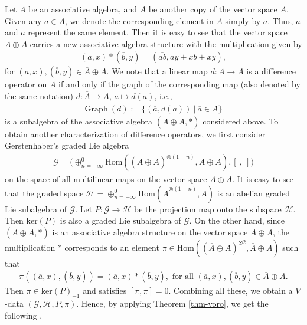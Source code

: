 \documentclass[a4paper,reqno,10pt]{amsart}
\theoremstyle{plain}
\theoremstyle{definition}
\theoremstyle{remark}
\begin{document}
Let $A$ be an associative algebra, and $\overline{A}$ be another copy of the vector space $A$. Given any $a \in A$, we denote the corresponding element in $\overline{A}$ simply by $\overline{a}$. Thus, $a$ and $\overline{a}$ represent the same element. Then it is easy to see that the vector space $ \overline{A} \oplus A$ carries a new associative algebra structure with the multiplication given by 
\begin{align*}
     (\overline{a}, x) \ast (\overline{b}, y) = ( \overline{a b}, a y + x b + xy),
\end{align*}
for $(\overline{a}, x) ,  (\overline{b}, y) \in \overline{A} \oplus A$. We note that a linear map $d : A \rightarrow A$ is a difference operator on $A$ if and only if the graph of the corresponding map (also denoted by the same notation) $d: \overline{A} \rightarrow A$, $\overline{a} \mapsto d(a)$, i.e., 
\begin{align*}
    \mathrm{Graph} ~ \! (d) := \{ ( \overline{a}, d(a)) ~ \! | ~ \! \overline{a} \in \overline{A} \}
\end{align*}
is a subalgebra of the associative algebra $(  \overline{A} \oplus A, \ast )$ considered above. To obtain another characterization of difference operators, we first consider Gerstenhaber's graded Lie algebra
\begin{align*}
    \mathcal{G} = \big( \oplus_{n= - \infty}^0 \mathrm{Hom} ( (\overline{A} \oplus A)^{\otimes (1-n)}, \overline{A} \oplus A ) , [~, ~] \big)
\end{align*}
on the space of all multilinear maps on the vector space $\overline{A} \oplus A$. It is easy to see that the graded space $\mathcal{H} =  \oplus_{n= - \infty}^0 \mathrm{Hom} ( \overline{A}^{\otimes (1-n)}, A )$ is an abelian graded Lie subalgebra of $\mathcal{G}$. Let $ P: \mathcal{G} \rightarrow \mathcal{H}$ be the projection map onto the subspace $\mathcal{H}$. Then $\mathrm{ker} (P)$ is also a graded Lie subalgebra of $\mathcal{G}$. On the other hand, since $(\overline{A} \oplus A, \ast)$ is an associative algebra structure on the vector space $\overline{A} \oplus A$, the multiplication $\ast$ corresponds to an element $\pi \in \mathrm{Hom} ( (\overline{A} \oplus A)^{\otimes 2}, \overline{A} \oplus A )$ such that 
\begin{align*}
    \pi ( (\overline{a}, x), (\overline{b}, y) ) =  (\overline{a}, x) \ast (\overline{b}, y), \text{ for all } (\overline{a}, x), (\overline{b}, y) \in \overline{A} \oplus A.
\end{align*}
Then $\pi \in \mathrm{ker}(P)_{-1}$ and satisfies $[\pi, \pi] = 0$. Combining all these, we obtain a $V$-data $(\mathcal{G}, \mathcal{H}, P, \pi)$. Hence, by applying Theorem \ref{thm-voro}, we get the following \cite{das,das-ram}.
\end{document}
